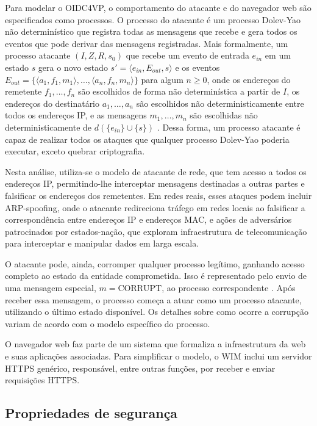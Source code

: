 Para modelar o \acs{OIDC4VP}, o comportamento do atacante e do navegador web são especificados como processos. 
O processo do atacante é um processo Dolev-Yao não determinístico que registra todas as mensagens que recebe e gera todos os eventos que pode derivar das mensagens registradas. 
Mais formalmente, um processo atacante $(I, Z, R, s_0)$ que recebe um evento de entrada $e_{in}$ em um estado $s$ gera o novo estado $s' = \langle e_{in}, E_{out}, s \rangle$ e os eventos 
$E_{out} = \{ \langle a_1, f_1, m_1 \rangle, \ldots, \langle a_n, f_n, m_n \rangle \}$ 
para algum $n \geq 0$, onde os endereços do remetente $f_1, \ldots, f_n$ são escolhidos de forma não determinística a partir de $I$, os endereços do destinatário $a_1, \ldots, a_n$ são escolhidos não deterministicamente entre todos os endereços IP, e as mensagens $m_1, \ldots, m_n$ são escolhidas não deterministicamente de $d(\{e_{in}\} \cup \{s\})$ \cite[Seção 2.5]{FettKS14}.
Dessa forma, um processo atacante é capaz de realizar todos os ataques que qualquer processo Dolev-Yao poderia executar, exceto quebrar criptografia.

Nesta análise, utiliza-se o modelo de atacante de rede, que tem acesso a todos os endereços IP, permitindo-lhe interceptar mensagens destinadas a outras partes e falsificar os endereços dos remetentes. Em redes reais, esses ataques podem incluir ARP-spoofing, onde o atacante redireciona tráfego em redes locais ao falsificar a correspondência entre endereços IP e endereços MAC, e ações de adversários patrocinados por estados-nação, que exploram infraestrutura de telecomunicação para interceptar e manipular dados em larga escala.

O atacante pode, ainda, corromper qualquer processo legítimo, ganhando acesso completo ao estado da entidade comprometida.
Isso é representado pelo envio de uma mensagem especial, $m = \text{CORRUPT}$, ao processo correspondente \cite[Seção 2.5]{FettKS14}. Após receber essa mensagem, o processo começa a atuar como um processo atacante, utilizando o último estado disponível. Os detalhes sobre como ocorre a corrupção variam de acordo com o modelo específico do processo.


O navegador web faz parte de um sistema que formaliza a infraestrutura da web e suas aplicações associadas. Para simplificar o modelo, o \acs{WIM} inclui um servidor HTTPS genérico, responsável, entre outras funções, por receber e enviar requisições HTTPS.



\subsection{Propriedades de segurança}\label{subsection:properties-of-formal-analysis}


